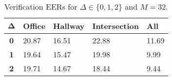 \begin{table}[h]
    \centering
    \begin{tabular}{|c|M{2cm}|M{2cm}|M{2cm}|M{2cm}|}
    \hline
    $\boldsymbol{\Delta}$ & \bf{Office} & \bf{Hallway} & \bf{Intersection} & \bf{All} \\ 
    \hline 
    \hline
    \bf{0} & 20.87 & 16.51 & 22.88 & 11.69 \\
    \hline
    \bf{1} & 19.64 & 15.47 & 19.98 & 9.99 \\
    \hline
    \bf{2} & 19.71 & 14.67 & 18.44 & 9.44 \\
    \hline
    \end{tabular}
    \caption{Verification EERs for $\Delta \in \{0, 1, 2\}$ and $M = 32$.}
    \label{tab:verify_adapted_wmv_M_32}
\end{table}
